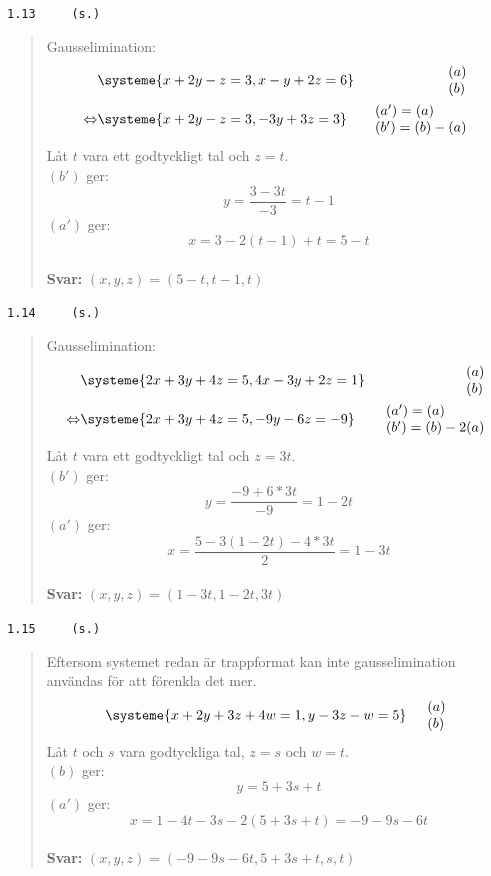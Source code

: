 \documentclass[a4paper]{article}
\newcommand{\tskcol}[1]{\textcolor{tskcol}{#1}}
\begin{document}
\pagebreak
\texttt{\tskcol{1.13~~~~ (s.)}}
\begin{quotation}
	\noindent
	Gausselimination:
	\begin{align*}
	&\systeme{
		x+2y- z=3,
		x- y+2z=6}  
	&\begin{array}{l} 
	(a) \\ 
	(b) 
	\end{array} \\ \Leftrightarrow
	&\systeme{
		x+2y- z=3,
		 -3y+3z=3}  
	&\begin{array}{l} 
	(a')=(a) \\ 
	(b')=(b)-(a) 
	\end{array} 
	\end{align*}
	Låt $t$ vara ett godtyckligt tal och $z=t$. \\
	$(b')$ ger:
	\[y=\frac{3-3t}{-3}=t-1\]
	$(a')$ ger:
	\[x=3-2(t-1)+t=5-t\]
	\\
	\textbf{Svar:} $(x,y,z)=(5-t,t-1,t)$
\end{quotation}

\texttt{\tskcol{1.14~~~~ (s.)}}
\begin{quotation}
	\noindent
	Gausselimination:
	\begin{align*}
	&\systeme{
		2x+3y+4z=5,
		4x-3y+2z=1}  
	&\begin{array}{l} 
	(a) \\ 
	(b) 
	\end{array} \\ \Leftrightarrow
	&\systeme{
		2x+3y+4z=5,
		  -9y-6z=-9}  
	&\begin{array}{l} 
	(a')=(a) \\ 
	(b')=(b)-2(a) 
	\end{array} 
	\end{align*}
	Låt $t$ vara ett godtyckligt tal och $z=3t$. \\
	$(b')$ ger:
	\[y=\frac{-9+6*3t}{-9}=1-2t\]
	$(a')$ ger:
	\[x=\frac{5-3(1-2t)-4*3t}{2}=1-3t\]
	\\
	\textbf{Svar:} $(x,y,z)=(1-3t,1-2t,3t)$
\end{quotation}

\texttt{\tskcol{1.15~~~~ (s.)}}
\begin{quotation}
	\noindent
	Eftersom systemet redan är trappformat kan inte gausselimination användas för att förenkla det mer.
	\begin{align*}
	&\systeme{
		x+2y+3z+4w=1,
		   y-3z- w=5}  
	&\begin{array}{l} 
	(a) \\ 
	(b) 
	\end{array}
	\end{align*}
	Låt $t$ och $s$ vara godtyckliga tal, $z=s$ och $w=t$. \\
	$(b)$ ger:
	\[y=5+3s+t\]
	$(a')$ ger:
	\[x=1-4t-3s-2(5+3s+t)=-9-9s-6t\]
	\\
	\textbf{Svar:} $(x,y,z)=(-9-9s-6t,5+3s+t,s,t)$
\end{quotation}
\end{document}

